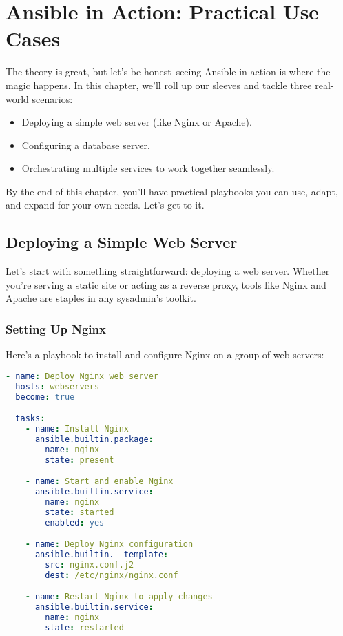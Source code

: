 \chapter{Ansible in Action: Practical Use Cases}

The theory is great, but let's be honest--seeing Ansible in action is where the magic happens. In this chapter, we'll roll up our sleeves and tackle three real-world scenarios:
\begin{itemize}
    \item Deploying a simple web server (like Nginx or Apache).
    \item Configuring a database server.
    \item Orchestrating multiple services to work together seamlessly.
\end{itemize}

By the end of this chapter, you'll have practical playbooks you can use, adapt, and expand for your own needs. Let's get to it.


\section{Deploying a Simple Web Server}

Let's start with something straightforward: deploying a web server. Whether you're serving a static site or acting as a reverse proxy, tools like Nginx and Apache are staples in any sysadmin's toolkit.

\subsection{Setting Up Nginx}

Here's a playbook to install and configure Nginx on a group of web servers:
\begin{lstlisting}[language=yaml, caption=Playbook for Nginx Deployment]
- name: Deploy Nginx web server
  hosts: webservers
  become: true

  tasks:
    - name: Install Nginx
      ansible.builtin.package:
        name: nginx
        state: present

    - name: Start and enable Nginx
      ansible.builtin.service:
        name: nginx
        state: started
        enabled: yes

    - name: Deploy Nginx configuration
      ansible.builtin.  template:
        src: nginx.conf.j2
        dest: /etc/nginx/nginx.conf

    - name: Restart Nginx to apply changes
      ansible.builtin.service:
        name: nginx
        state: restarted
\end{lstlisting}


